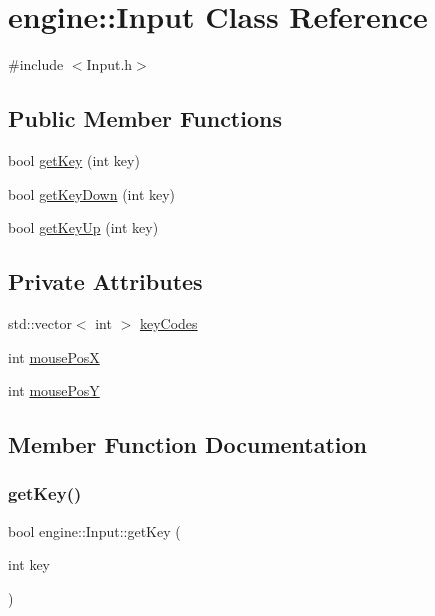 \hypertarget{classengine_1_1_input}{}\section{engine\+:\+:Input Class Reference}
\label{classengine_1_1_input}


{\ttfamily \#include $<$Input.\+h$>$}

\subsection*{Public Member Functions}
\begin{DoxyCompactItemize}
\item 
bool \mbox{\hyperlink{classengine_1_1_input_ad2524f686578386154d4506a80b2ad27}{get\+Key}} (int key)
\item 
bool \mbox{\hyperlink{classengine_1_1_input_a86ac19aea5de2304dd315c49f5ef3614}{get\+Key\+Down}} (int key)
\item 
bool \mbox{\hyperlink{classengine_1_1_input_a00df52eaf0417f007606cf11308e49a0}{get\+Key\+Up}} (int key)
\end{DoxyCompactItemize}
\subsection*{Private Attributes}
\begin{DoxyCompactItemize}
\item 
std\+::vector$<$ int $>$ \mbox{\hyperlink{classengine_1_1_input_a490e03a88661b685e9a397b3a7b78f0b}{key\+Codes}}
\item 
int \mbox{\hyperlink{classengine_1_1_input_a339596d9f08fe1e879ca1e3a81d7f381}{mouse\+PosX}}
\item 
int \mbox{\hyperlink{classengine_1_1_input_a1db046321740828b8f90dd31014c779c}{mouse\+PosY}}
\end{DoxyCompactItemize}


\subsection{Member Function Documentation}
\mbox{\label{classengine_1_1_input_ad2524f686578386154d4506a80b2ad27}} 
\subsubsection{\texorpdfstring{get\+Key()}{getKey()}}
{\footnotesize\ttfamily bool engine\+::\+Input\+::get\+Key (\begin{DoxyParamCaption}\item[{int}]{key }\end{DoxyParamCaption})}

